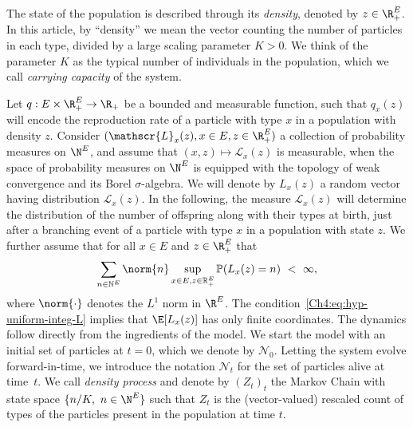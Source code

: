 \begin{refsegment}
The state of the population is described through its \emph{density}, denoted by 
 $z\in \R_+^E$. In this article, by ``density'' we mean the vector counting the number of particles in each type, divided by a large scaling parameter $K>0$. 
 We think of the parameter $K$ as the typical number of individuals in the population, which we call \emph{carrying capacity} of the system.

Let $q:E\times \R_+^E\to \R_+$ be a bounded and measurable function, such that $q_x(z)$ will encode the reproduction rate of a particle with type $x$ in a population with density $z$.
Consider $(\mathscr{L}_x(z), x\in E, z\in \R_+^E)$ a collection of probability measures on $\N^E$, and assume that $(x,z)\mapsto \mathscr{L}_x(z)$ is measurable, when the space of probability measures on $\N^E$ is equipped with the topology of weak convergence and its Borel $\sigma$-algebra. 
We will denote by $L_x(z)$ a random vector having distribution $\mathscr{L}_x(z)$. In the following, the measure $\mathscr{L}_x(z)$ will determine the distribution of the number of offspring along with their types at birth, just after a branching event of a particle with type $x$ in a population with state
 $z$. We further assume that for all $x\in E$ and $z\in \R_+^E$  that
 \begin{equation} \label{Ch4:eq:hyp-uniform-integ-L}   \sum_{n\in \mathbb{N}^E} \norm{n} \sup_{x\in E, z\in \mathbb{R}_+^E} \mathbb{P}(L_x(z) = n) \ <\ \infty,
\end{equation}
where $\norm{\cdot}$ denotes the $L^1$ norm in $\R^E$. The condition~\eqref{Ch4:eq:hyp-uniform-integ-L} implies that $\E[L_x(z)]$ has only finite coordinates.
The dynamics follow directly from the ingredients of the model. We start the model with an initial set of particles at $t=0$, which we denote by 
 $  \mathcal{N}_0$. Letting the system evolve forward-in-time, we introduce the notation
 $  \mathcal{N}_t$ for the set of particles alive at time~$t$. 
 We call \textit{density process} and denote  by $(Z_t)_t$ the Markov Chain with state space $\{n/K,\ n\in \N^E\}$ such that
$Z_t$ is the (vector-valued) rescaled count of types of the particles present in the population at time $t$. 


\end{refsegment}
